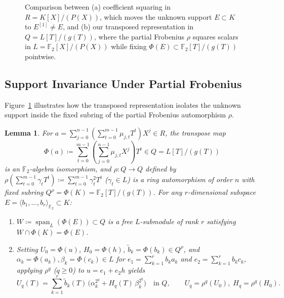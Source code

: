 \documentclass[11pt,a4paper]{article}
\newtheorem{lemma}[theorem]{Lemma}
\theoremstyle{definition}
\theoremstyle{remark}
\newcommand{\Ftwo}{\mathbb{F}_2}
\begin{document}
\begin{figure}[t]
\caption{Comparison between (a) coefficient squaring in $R = K[X]/(P(X))$, which moves the unknown support $E \subset K$ to $E^{[1]} \neq E$, and (b) our transposed representation in $Q = L[T]/(g(T))$, where the partial Frobenius $\rho$ squares scalars in $L = \Ftwo[X]/(P(X))$ while fixing $\Phi(E) \subset \Ftwo[T]/(g(T))$ pointwise.}
\label{fig:transpose-frobenius}
\end{figure}

\subsection{Support Invariance Under Partial Frobenius}
Figure~\ref{fig:transpose-frobenius} illustrates how the transposed representation isolates the unknown support inside the fixed subring of the partial Frobenius automorphism $\rho$.

\begin{lemma}
\label{lem:transpose}
For $a = \sum_{j=0}^{n-1}(\sum_{t=0}^{m-1} \mu_{j,t} T^t) X^j \in R$, the transpose map
\[
    \Phi(a) \coloneqq \sum_{t=0}^{m-1} \left(\sum_{j=0}^{n-1} \mu_{j,t} X^j\right) T^t \in Q = L[T]/(g(T))
\]
is an $\Ftwo$-algebra isomorphism, and $\rho: Q \to Q$ defined by $\rho(\sum_{t=0}^{m-1} \gamma_t T^t) \coloneqq \sum_{t=0}^{m-1} \gamma_t^2 T^t$ ($\gamma_t \in L$) is a ring automorphism of order $n$ with fixed subring $Q^\rho = \Phi(K) = \Ftwo[T]/(g(T))$. For any $r$-dimensional subspace $E = \langle b_1, \dots, b_r \rangle_{\Ftwo} \subset K$:
\begin{enumerate}[leftmargin=1.8em,itemsep=2pt]
    \item $W \coloneqq \operatorname{span}_L(\Phi(E)) \subset Q$ is a free $L$-submodule of rank $r$ satisfying $W \cap \Phi(K) = \Phi(E)$.
    \item Setting $U_0 = \Phi(u)$, $H_0 = \Phi(h)$, $\tilde{b}_k = \Phi(b_k) \in Q^\rho$, and $\alpha_k = \Phi(a_k), \beta_k = \Phi(c_k) \in L$ for $e_1 = \sum_{k=1}^r b_k a_k$ and $e_2 = \sum_{k=1}^r b_k c_k$, applying $\rho^q$ ($q \ge 0$) to $u = e_1 + e_2 h$ yields
    \begin{equation}
    \label{eq:conj-orbit}
        U_q(T) = \sum_{k=1}^{r} \tilde{b}_k(T)\,\bigl(\alpha_k^{2^q} + H_q(T)\,\beta_k^{2^q}\bigr) \quad \text{in } Q, \qquad U_q = \rho^q(U_0),\; H_q = \rho^q(H_0).
    \end{equation}
\end{enumerate}
\end{lemma}
\end{document}

